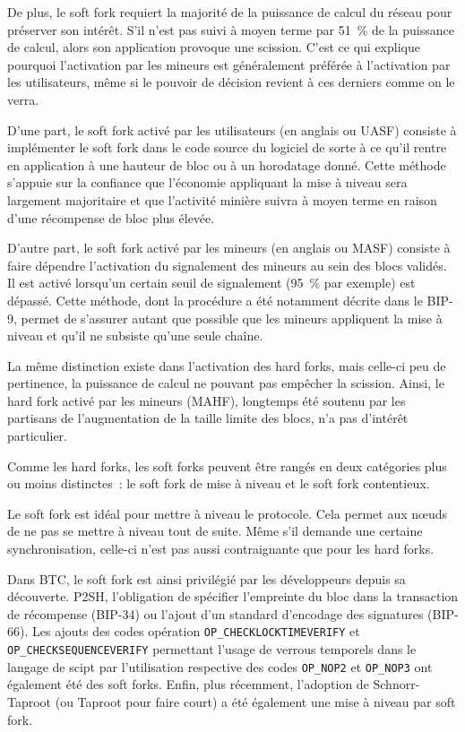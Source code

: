 De plus, le soft fork requiert la majorité de la puissance de calcul du réseau pour préserver son intérêt. S'il n'est pas suivi à moyen terme par 51~\% de la puissance de calcul, alors son application provoque une scission. C'est ce qui explique pourquoi l'activation par les mineurs est généralement préférée à l'activation par les utilisateurs, même si le pouvoir de décision revient à ces derniers comme on le verra.

D'une part, le soft fork activé par les utilisateurs (en anglais  ou UASF) consiste à implémenter le soft fork dans le code source du logiciel de sorte à ce qu'il rentre en application à une hauteur de bloc ou à un horodatage donné. Cette méthode s'appuie sur la confiance que l'économie appliquant la mise à niveau sera largement majoritaire et que l'activité minière suivra à moyen terme en raison d'une récompense de bloc plus élevée.

D'autre part, le soft fork activé par les mineurs (en anglais  ou MASF) consiste à faire dépendre l'activation du signalement des mineurs au sein des blocs validés. Il est activé lorsqu'un certain seuil de signalement (95~\% par exemple) est dépassé. Cette méthode, dont la procédure a été notamment décrite dans le BIP-9, permet de s'assurer autant que possible que les mineurs appliquent la mise à niveau et qu'il ne subsiste qu'une seule chaîne.

La même distinction existe dans l'activation des hard forks, mais celle-ci peu de pertinence, la puissance de calcul ne pouvant pas empêcher la scission. Ainsi, le hard fork activé par les mineurs (MAHF), longtemps été soutenu par les partisans de l'augmentation de la taille limite des blocs, n'a pas d'intérêt particulier.

Comme les hard forks, les soft forks peuvent être rangés en deux catégories plus ou moins distinctes~: le soft fork de mise à niveau et le soft fork contentieux.

Le soft fork est idéal pour mettre à niveau le protocole. Cela permet aux nœuds de ne pas se mettre à niveau tout de suite. Même s'il demande une certaine synchronisation, celle-ci n'est pas aussi contraignante que pour les hard forks.

Dans BTC, le soft fork est ainsi privilégié par les développeurs depuis sa découverte. P2SH, l'obligation de spécifier l'empreinte du bloc dans la transaction de récompense (BIP-34) ou l'ajout d'un standard d'encodage des signatures (BIP-66). Les ajouts des codes opération \texttt{OP\_CHECKLOCKTIMEVERIFY} et \texttt{OP\_CHECKSEQUENCEVERIFY} permettant l'usage de verrous temporels dans le langage de scipt par l'utilisation respective des codes \texttt{OP\_NOP2} et \texttt{OP\_NOP3} ont également été des soft forks. Enfin, plus récemment, l'adoption de Schnorr-Taproot (ou Taproot pour faire court) a été également une mise à niveau par soft fork.

